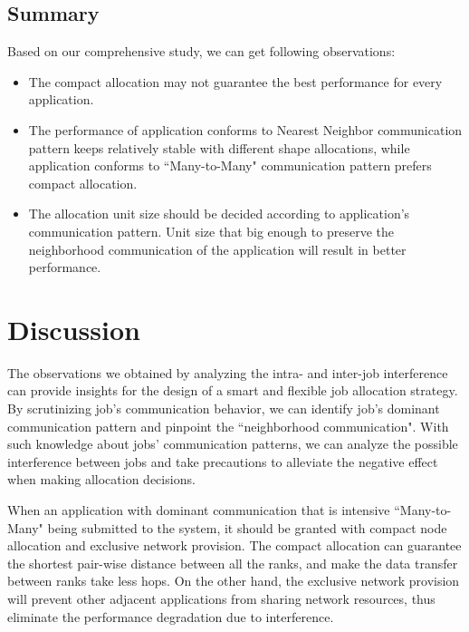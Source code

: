 \documentclass[conference]{IEEEtran}
\begin{document}
\subsection{Summary}
\label{sec:summary}

Based on our comprehensive study, we can get following observations:
\begin{itemize}
    \item The compact allocation may not guarantee the best performance for every application. 
    \item The performance of application conforms to Nearest Neighbor communication pattern keeps relatively stable with different shape allocations, while application conforms to ``Many-to-Many" communication pattern prefers compact allocation. 
    \item The allocation unit size should be decided according to application's communication pattern. Unit size that big enough to preserve the neighborhood communication of the application will result in better performance. 
\end{itemize}






\section{Discussion}
\label{sec:discussion}

 
The observations we obtained by analyzing the intra- and inter-job interference can provide insights for the design of a smart and flexible job allocation strategy. By scrutinizing job's communication behavior, we can identify job's dominant communication pattern and pinpoint the ``neighborhood communication". With such knowledge about jobs' communication patterns, we can analyze the possible interference between jobs and take precautions to alleviate the negative effect when making allocation decisions. 

When an application with dominant communication that is intensive ``Many-to-Many" being submitted to the system, it should be granted with compact node allocation and exclusive network provision. The compact allocation can guarantee the shortest pair-wise distance between all the ranks, and make the data transfer between ranks take less hops. On the other hand, the exclusive network provision will prevent other adjacent applications from sharing network resources, thus eliminate the performance degradation due to interference.
\end{document}
